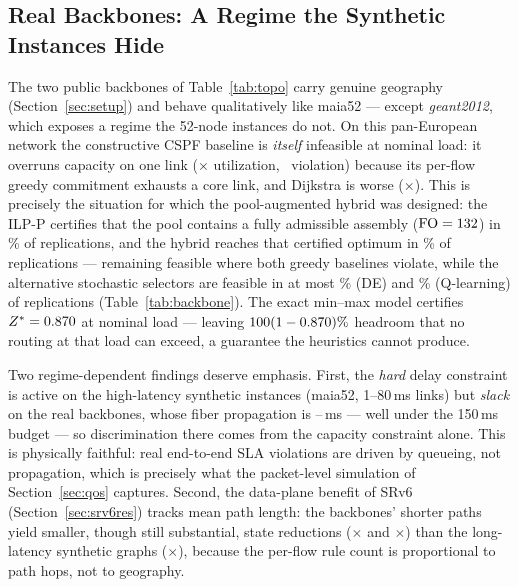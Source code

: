 \documentclass[journal]{IEEEtran}
\newcommand{\FO}{\mathrm{FO}}
\begin{document}
\subsection{Real Backbones: A Regime the Synthetic Instances Hide}
\label{sec:backbone}
The two public backbones of Table~\ref{tab:topo} carry genuine geography
(Section~\ref{sec:setup}) and behave qualitatively like maia52 --- except
\emph{geant2012}, which exposes a regime the 52-node instances do not. On this
pan-European network the constructive CSPF baseline is \emph{itself}
infeasible at nominal load: it overruns capacity on one link
(\AntCspfMaxUtil$\times$ utilization, \AntCspfViol\ violation) because its
per-flow greedy commitment exhausts a core link, and Dijkstra is worse
(\AntDjMaxUtil$\times$). This is precisely the situation for which the
pool-augmented hybrid was designed: the ILP-P certifies that the pool contains
a fully admissible assembly ($\FO=\AntPoolOpt$) in
\AntPoolOptFeasRate\% of replications, and the hybrid reaches that
certified optimum in \AntGaFeas\% of replications --- remaining feasible
where both greedy baselines violate, while the alternative stochastic
selectors are feasible in at most \AntDeFeas\% (DE) and \AntQlFeas\%
(Q-learning) of replications (Table~\ref{tab:backbone}). The exact
min--max model certifies $Z^{*}=0.870$ at nominal load --- leaving
$100(1-0.870)\%$ headroom that no routing at that load can exceed, a
guarantee the heuristics cannot produce.

Two regime-dependent findings deserve emphasis. First, the
\emph{hard} delay constraint is active on the high-latency synthetic instances
(maia52, 1--80\,ms links) but \emph{slack} on the real backbones, whose fiber
propagation is \AntDelayGeantMin--\AntDelayGeantMax\,ms --- well under the
150\,ms budget --- so discrimination there comes from the capacity constraint
alone. This is physically faithful: real end-to-end SLA violations are driven
by queueing, not propagation, which is precisely what the packet-level
simulation of Section~\ref{sec:qos} captures. Second, the data-plane benefit of
SRv6 (Section~\ref{sec:srv6res}) tracks mean path length: the backbones'
shorter paths yield smaller, though still substantial, state reductions
(\SrvRedGer$\times$ and \SrvRedGeant$\times$) than the long-latency synthetic
graphs (\SrvRedMaia$\times$), because the per-flow rule count is proportional
to path hops, not to geography.
\end{document}
